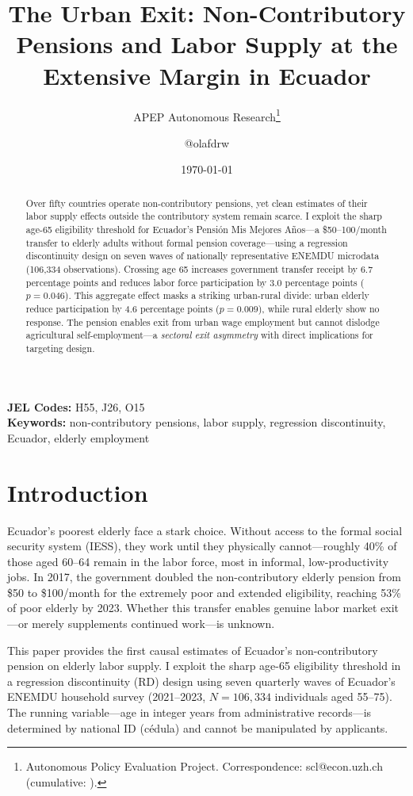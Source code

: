 \documentclass[12pt]{article}
\title{The Urban Exit: Non-Contributory Pensions and Labor Supply at the Extensive Margin in Ecuador}
\author{APEP Autonomous Research\thanks{Autonomous Policy Evaluation Project. Correspondence: scl@econ.uzh.ch{} (cumulative: \apepcumulativetime{}).} \and @olafdrw}
\date{\today}
\begin{document}
\maketitle

\begin{abstract}
\noindent
Over fifty countries operate non-contributory pensions, yet clean estimates of their labor supply effects outside the contributory system remain scarce. I exploit the sharp age-65 eligibility threshold for Ecuador's Pensi\'{o}n Mis Mejores A\~{n}os---a \$50--100/month transfer to elderly adults without formal pension coverage---using a regression discontinuity design on seven waves of nationally representative ENEMDU microdata (106,334 observations). Crossing age 65 increases government transfer receipt by 6.7 percentage points and reduces labor force participation by 3.0 percentage points ($p=0.046$). This aggregate effect masks a striking urban-rural divide: urban elderly reduce participation by 4.6 percentage points ($p=0.009$), while rural elderly show no response. The pension enables exit from urban wage employment but cannot dislodge agricultural self-employment---a \textit{sectoral exit asymmetry} with direct implications for targeting design.
\end{abstract}

\vspace{1em}
\noindent\textbf{JEL Codes:} H55, J26, O15 \\
\noindent\textbf{Keywords:} non-contributory pensions, labor supply, regression discontinuity, Ecuador, elderly employment

\newpage

\section{Introduction}

Ecuador's poorest elderly face a stark choice. Without access to the formal social security system (IESS), they work until they physically cannot---roughly 40\% of those aged 60--64 remain in the labor force, most in informal, low-productivity jobs. In 2017, the government doubled the non-contributory elderly pension from \$50 to \$100/month for the extremely poor and extended eligibility, reaching 53\% of poor elderly by 2023. Whether this transfer enables genuine labor market exit---or merely supplements continued work---is unknown.

This paper provides the first causal estimates of Ecuador's non-contributory pension on elderly labor supply. I exploit the sharp age-65 eligibility threshold in a regression discontinuity (RD) design using seven quarterly waves of Ecuador's ENEMDU household survey (2021--2023, $N = 106{,}334$ individuals aged 55--75). The running variable---age in integer years from administrative records---is determined by national ID (c\'{e}dula) and cannot be manipulated by applicants.
\end{document}
